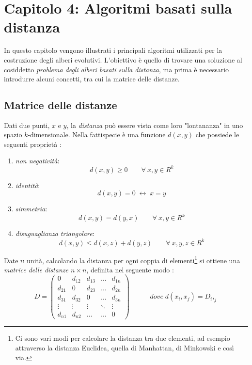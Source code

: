 \chapter{Capitolo 4: Algoritmi basati sulla distanza}
In questo capitolo vengono illustrati i principali algoritmi utilizzati per la costruzione degli alberi evolutivi. L'obiettivo è quello di trovare una soluzione al cosiddetto \textit{problema degli alberi basati sulla distanza}, ma prima è necessario introdurre alcuni concetti, tra cui la matrice delle distanze.

\section{Matrice delle distanze}
Dati due punti, $x$ e $y$, la \textit{distanza} può essere vista come loro "lontananza" in uno spazio $k$-dimensionale. Nella fattispecie è una funzione $d(x,y)$ che possiede le seguenti proprietà \cite{molaCagliari}:
\begin{enumerate}
	\item \textit{non negatività}:
	\[d(x,y)\geq 0\hspace{2em} \forall \: x,y\in R^k\]
	\item \textit{identità}:
	\[d(x,y)=0 \; \leftrightarrow \; x=y\]
	\item \textit{simmetria}:
	\[d(x,y)=d(y,x)\hspace{2em} \forall \: x,y\in R^k\]
	\item \textit{disuguaglianza triangolare}:
	\[d(x,y)\leq d(x,z)+d(y,z)\hspace{2em} \forall \: x,y,z\in R^k\]
\end{enumerate}
Date $n$ unità, calcolando la distanza per ogni coppia di elementi\footnote{Ci sono vari modi per calcolare la distanza tra due elementi, ad esempio attraverso la distanza Euclidea, quella di Manhattan, di Minkowski e così via.} si ottiene una \textit{matrice delle distanze $n \times n$}, definita nel seguente modo \cite{ingrassiaStatistica}:
\[
D = \begin{pmatrix}
0 & d_{12} & d_{13} & \ldots & d_{1n} \\ 
d_{21} & 0 & d_{23} & \ldots & d_{2n} \\ 
d_{31} & d_{32} & 0 & \ldots & d_{3n} \\ 
\vdots & \vdots & \vdots & \ddots & \vdots \\ 
d_{n1} & d_{n2} & \ldots & \ldots & 0
\end{pmatrix}
\hspace{3em}dove\;d(x_i,x_j)=D_i,_j
\]
